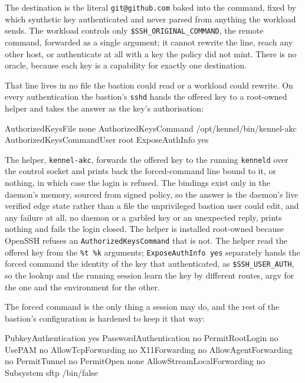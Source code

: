 
The destination is the literal \texttt{git@github.com} baked into the
command, fixed by which synthetic key authenticated and never parsed
from anything the workload sends. The workload controls only
\texttt{\$SSH\_ORIGINAL\_COMMAND}, the remote command, forwarded as a
single argument; it cannot rewrite the line, reach any other host, or
authenticate at all with a key the policy did not mint. There is no
oracle, because each key is a capability for exactly one destination.

That line lives in no file the bastion could read or a workload could
rewrite. On every authentication the bastion's \texttt{sshd} hands the
offered key to a root-owned helper and takes the answer as the key's
authorisation:

\begin{kennelcode}
AuthorizedKeysFile none
AuthorizedKeysCommand /opt/kennel/bin/kennel-akc %
AuthorizedKeysCommandUser root
ExposeAuthInfo yes
\end{kennelcode}

The helper, \texttt{kennel-akc}, forwards the offered key to the running
\texttt{kenneld} over the control socket and prints back the
forced-command line bound to it, or nothing, in which case the login is
refused. The bindings exist only in the daemon's memory, sourced from
signed policy, so the answer is the daemon's live verified edge state
rather than a file the unprivileged bastion user could edit, and any
failure at all, no daemon or a garbled key or an unexpected reply,
prints nothing and fails the login closed. The helper is installed
root-owned because OpenSSH refuses an \texttt{AuthorizedKeysCommand}
that is not. The helper read the offered key from the \texttt{\%t\ \%k}
arguments; \texttt{ExposeAuthInfo\ yes} separately hands the forced
command the identity of the key that authenticated, as
\texttt{\$SSH\_USER\_AUTH}, so the lookup and the running session learn
the key by different routes, argv for the one and the environment for
the other.

The forced command is the only thing a session may do, and the rest of
the bastion's configuration is hardened to keep it that way:

\begin{kennelcode}
PubkeyAuthentication yes
PasswordAuthentication no
PermitRootLogin no
UsePAM no
AllowTcpForwarding no
X11Forwarding no
AllowAgentForwarding no
PermitTunnel no
PermitOpen none
AllowStreamLocalForwarding no
Subsystem sftp /bin/false
\end{kennelcode}

